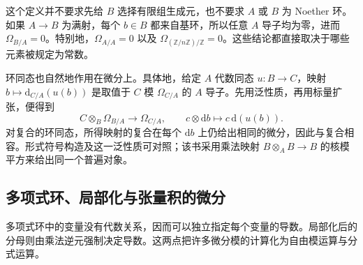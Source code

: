 这个定义并不要求先给 \(B\) 选择有限组生成元，也不要求 \(A\) 或 \(B\) 为 Noether 环。如果 \(A\to B\) 为满射，每个 \(b\in B\) 都来自基环，所以任意 \(A\) 导子均为零，进而 \(\Omega_{B/A}=0\)。特别地，\(\Omega_{A/A}=0\) 以及 \(\Omega_{(\mathbb Z/n\mathbb Z)/\mathbb Z}=0\)。这些结论都直接取决于哪些元素被规定为常数。

\ProseParagraphBreak

环同态也自然地作用在微分上。具体地，给定 \(A\) 代数同态 \(u:B\to C\)，映射 \(b\mapsto\mathrm{d}_{C/A}(u(b))\) 是取值于 \(C\) 模 \(\Omega_{C/A}\) 的 \(A\) 导子。先用泛性质，再用标量扩张，便得到
\begin{equation}\label{g5:eq:differentials-natural-map}
	C\otimes_B\Omega_{B/A}\longrightarrow\Omega_{C/A},
	\qquad c\otimes\mathrm{d}b\longmapsto c\,\mathrm{d}(u(b)).
\end{equation}
对复合的环同态，所得映射的复合在每个 \(\mathrm{d}b\) 上仍给出相同的微分，因此与复合相容。形式符号构造及这一泛性质可对照\cite[第25节，第190--193页]{Matsumura1989}；该书采用乘法映射 \(B\otimes_A B\to B\) 的核模平方来给出同一个普遍对象。

\subsection{多项式环、局部化与张量积的微分}
\label{g5:subsec:0501:03}

多项式环中的变量没有代数关系，因而可以独立指定每个变量的导数。局部化后的分母则由乘法逆元强制决定导数。这两点把许多微分模的计算化为自由模运算与分式运算。

